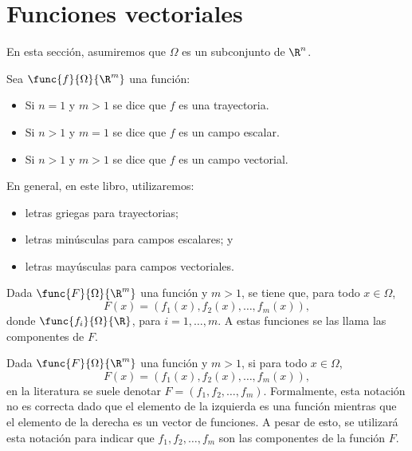 \documentclass[a4,11pt]{aleph-notas}
\begin{document}
\encabezado

\section{Funciones vectoriales}

En esta sección, asumiremos que $\Omega$ es un subconjunto de $\R^n$.

\begin{defi}
    Sea $\func{f}{\Omega}{\R^m}$ una función:
    \begin{itemize}
        \item Si $n=1$ y $m>1$ se dice que $f$ es una trayectoria.
        \item Si $n>1$ y $m=1$ se dice que $f$ es un campo escalar.
        \item Si $n>1$ y $m>1$ se dice que $f$ es un campo vectorial.
    \end{itemize}
\end{defi}

\begin{advertencia}
    En general, en este libro, utilizaremos:
    \begin{itemize}
        \item letras griegas para trayectorias;
        \item letras minúsculas para campos escalares; y
        \item letras mayúsculas para campos vectoriales.
    \end{itemize}
\end{advertencia}

\begin{defi}[Componentes]
    Dada $\func{F}{\Omega}{\R^m}$ una función y $m>1$, se tiene que, para todo $x\in \Omega$,
    \[
        F(x)=(f_1(x),f_2(x),\ldots,f_m(x)),
    \]
    donde $\func{f_i}{\Omega}{\R}$, para $i=1,\ldots,m$. A estas funciones se las llama las componentes de $F$.
\end{defi}

\begin{advertencia}
    Dada $\func{F}{\Omega}{\R^m}$ una función y $m>1$, si para todo $x\in \Omega$,
    \[
        F(x)=(f_1(x),f_2(x),\ldots,f_m(x)),
    \]
    en la literatura se suele denotar $F=(f_1,f_2,\ldots,f_m)$. Formalmente, esta notación no es correcta dado que el elemento de la izquierda es una función mientras que el elemento de la derecha es un vector de funciones. A pesar de esto, se utilizará esta notación para indicar que $f_1,f_2,\ldots,f_m$ son las componentes de la función $F$.
\end{advertencia}
\end{document}
